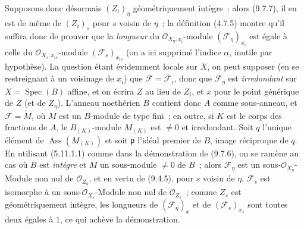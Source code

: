 Supposons donc désormais $(Z_i)_\eta$ géométriquement intègre~; alors (9.7.7),
il en est de même de $(Z_i)_s$ pour $s$ voisin de $\eta$~; la définition (4.7.5)
montre qu'il suffira donc de prouver que la \emph{longueur} du
$\mathcal O_{X_\eta,x_i}$-module $(\mathcal F_\eta)_{x_i}$ est égale à celle du
$\mathcal O_{X_s,x_{is}}$-module $(\mathcal F_s)_{x_{is}}$ (on a ici supprimé
l'indice $\alpha$, inutile par hypothèse). La question étant évidemment locale
sur $X$, on peut supposer (en se restreignant à un voisinage de $x_i$) que
$\mathcal F=\mathcal F_i$, donc que $\mathcal F_\eta$ est \emph{irredondant} sur
$X=\operatorname{Spec}(B)$ affine, et on écrira $Z$ au lieu de $Z_i$, et $x$
pour le point générique de $Z$ (et de $Z_\eta$). L'anneau noethérien $B$
contient donc $A$ comme sous-anneau, et $\mathcal F=\widetilde M$, où $M$ est un
$B$-module de type fini~; en outre, si $K$ est le corps des fractions de $A$,
le $B_{(K)}$-module $M_{(K)}$ est $\neq0$ et irredondant. Soit $q$ l'unique
élément de $\operatorname{Ass}(M_{(K)})$ et soit $\mathfrak p$ l'idéal premier
de $B$, image réciproque de $q$. En utilisant (5.11.1.1) comme dans la
démonstration de (9.7.6), on se ramène au cas où $B$ est \emph{intègre} et $M$
un sous-module $\neq0$ de $B$~; alors $\mathcal F_\eta$ est un
sous-$\mathcal O_{X_\eta}$-Module non nul de $\mathcal O_{Z_\eta}$, et en vertu
de (9.4.5), pour $s$ voisin de $\eta$, $\mathcal F_s$ est isomorphe à un
sous-$\mathcal O_{X_s}$-Module non nul de $\mathcal O_{Z_s}$~; comme $Z_s$ est
géométriquement intègre, les longueurs de $(\mathcal F_\eta)_x$ et de
$(\mathcal F_s)_{x_s}$ sont toutes deux égales à $1$, ce qui achève la
démonstration.

